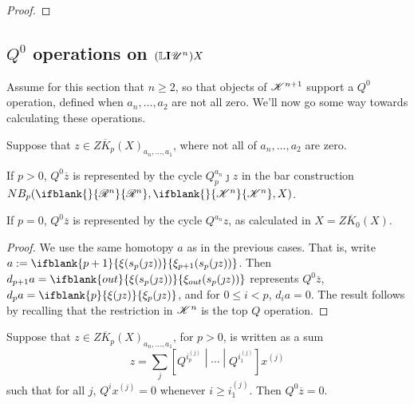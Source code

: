 \documentclass[11pt]{article}
\makeatletter
\newcommand{\PRLie}[1]{\scrR^{#1}}%
\newcommand{\LL}[1]{{\scrK}^{#1}}%
\newcommand{\nontop}[1]{\scrU^{#1}}%
\newcommand{\produces}[3]{{#1}{#3}{#2}}
\newcommand{\Ind}[2][]{\mathbf{I}{#2}_{#1}}%
\newcommand{\Fr}[2][]{\ifblank{#1}{#2}{#2_{#1}}}
\newcommand{\restn}[2][]{\ifblank{#1}{\xi{#2}}{\xi_{#1}{#2}}}%
\newcommand{\derived}{\mathbb{L}}
\renewcommand{\Q}{Q}
\newcommand{\minDimP}{\overline{m}}
\renewcommand{\produces}[3]{
{
\def\labelstyle{\scriptstyle}
\xymatrix@C=2em@1{
{#1}
\ar@{-}[r]|-{{\,#3\,}}
&%
{#2}%
}}}
\makeatother
\begin{document}
\begin{LieLambdaStructureOnKoszul}
\begin{proof}
%
\end{proof}

\subsection{$\Q^0$ operations on $(\derived\Ind{\nontop{n}})X$}
Assume for this section that $n\geq2$, so that objects of $\LL{n+1}$ support a $\Q^0$ operation, defined when $a_n,\ldots,a_2$ are not all zero. We'll now go some way towards calculating these operations.
\begin{lem*}
Suppose that $z\in Z\overline{K}_p(X)_{a_n,\ldots,a_1}$, where not all of $a_n,\ldots,a_2$ are zero. 
\begin{itemise}
\setlength{\parindent}{.25in}
\item If $p>0$, $Q^0\overline{z}$ is represented by the cycle $\Q^{a_n}_p\jmath z$ in the bar construction $NB_p(\Fr{\PRLie{n}},\Fr{\LL{n}},X)$.
\item If $p=0$, $Q^0\overline{z}$ is represented by the cycle $\Q^{a_n}z$, as calculated in $X=Z\overline{K}_0(X)$.%
\end{itemise}
\end{lem*}
\begin{proof}
We use the same homotopy $a$ as in the previous cases. That is, write
$a:=\restn[p+1]{(s_{p}(\jmath z))}$. Then $d_{p+1}a=\restn[out]{(s_{p}(\jmath z))}$ represents $Q^0\overline{z}$, $d_pa=\restn[p]{(\jmath z)}$, and for $0\leq i<p$, $d_ia=0$. The result follows by recalling that the restriction in $\LL{n}$ is the top $\Q$ operation.
\end{proof}
\begin{lem*}
Suppose that $z\in Z\overline{K}_p(X)_{a_n,\ldots,a_1}$, for $p>0$, is written as a sum
\[z=\sum_{j}\left[\Q^{i^{{(j)}}_p}\middle|\cdots \middle|\Q^{i^{{(j)}}_1}\right]x^{(j)}\]
such that for all $j$, 
$\Q^ix^{(j)}=0$ whenever $i\geq i^{{(j)}}_1$. Then $\Q^0\overline{z}=0$.


\end{lem*}
\end{LieLambdaStructureOnKoszul}
\end{document}

